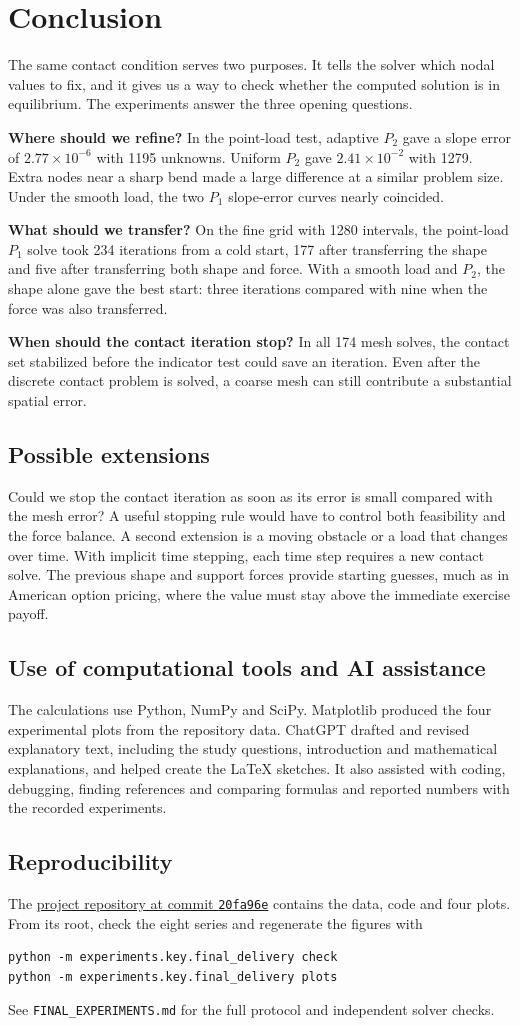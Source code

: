 \documentclass[11pt,a4paper]{article}
\newcommand{\sect}[1]{\Needspace{7\baselineskip}\section{#1}}
\newcommand{\subsect}[1]{\Needspace{5\baselineskip}\subsection{#1}}
\begin{document}
\sect{Conclusion}\label{sec:conclusion}
The same contact condition serves two purposes. It tells the solver which nodal values to fix, and it gives us a way to check whether the computed solution is in equilibrium. The experiments answer the three opening questions.

\textbf{Where should we refine?} In the point-load test, adaptive $P_2$ gave a slope error of $2.77\times10^{-6}$ with 1195 unknowns. Uniform $P_2$ gave $2.41\times10^{-2}$ with 1279. Extra nodes near a sharp bend made a large difference at a similar problem size. Under the smooth load, the two $P_1$ slope-error curves nearly coincided.

\textbf{What should we transfer?} On the fine grid with 1280 intervals, the point-load $P_1$ solve took 234 iterations from a cold start, 177 after transferring the shape and five after transferring both shape and force. With a smooth load and $P_2$, the shape alone gave the best start: three iterations compared with nine when the force was also transferred.

\textbf{When should the contact iteration stop?} In all 174 mesh solves, the contact set stabilized before the indicator test could save an iteration. Even after the discrete contact problem is solved, a coarse mesh can still contribute a substantial spatial error.

\subsect{Possible extensions}
Could we stop the contact iteration as soon as its error is small compared with the mesh error? A useful stopping rule would have to control both feasibility and the force balance. A second extension is a moving obstacle or a load that changes over time. With implicit time stepping, each time step requires a new contact solve. The previous shape and support forces provide starting guesses, much as in American option pricing, where the value must stay above the immediate exercise payoff.

\subsect{Use of computational tools and AI assistance}
The calculations use Python, NumPy and SciPy. Matplotlib produced the four experimental plots from the repository data. ChatGPT drafted and revised explanatory text, including the study questions, introduction and mathematical explanations, and helped create the LaTeX sketches. It also assisted with coding, debugging, finding references and comparing formulas and reported numbers with the recorded experiments.

\subsect{Reproducibility}
The \href{https://github.com/victor-sieber/obstacle-problem-fem/tree/20fa96e657c0d67721bd84887e3c8a3d6f39df71}{project repository at commit \texttt{20fa96e}} contains the data, code and four plots. From its root, check the eight series and regenerate the figures with
\begin{verbatim}
python -m experiments.key.final_delivery check
python -m experiments.key.final_delivery plots
\end{verbatim}
See \texttt{FINAL\_EXPERIMENTS.md} for the full protocol and independent solver checks.
\end{document}
